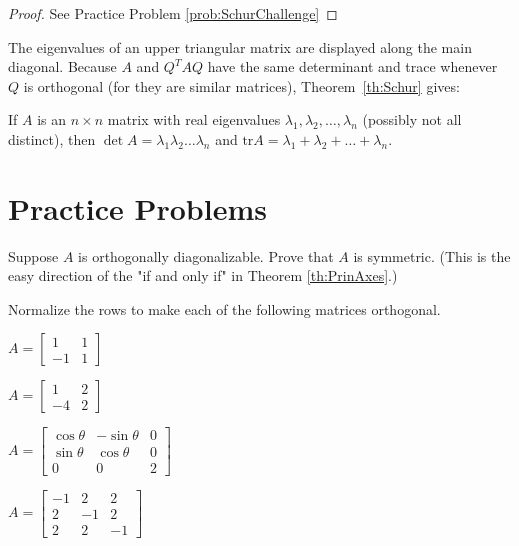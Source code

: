 \documentclass{ximera}
\begin{document}
\begin{proof}
See Practice Problem \ref{prob:SchurChallenge}
\end{proof}

The eigenvalues of an upper triangular matrix are displayed along the main diagonal. Because $A$ and $Q^{T}AQ$ have the same determinant and trace whenever $Q$ is orthogonal (for they are similar matrices), Theorem~\ref{th:Schur} gives:

\begin{corollary}\label{cor:det_and_tr}
If $A$ is an $n \times n$ matrix with real eigenvalues $\lambda_{1}, \lambda_{2}, \dots, \lambda_{n}$ (possibly not all distinct), then $\det A = \lambda_{1}\lambda_{2} \dots \lambda_{n}$ and $\mbox{tr} A = \lambda_{1} + \lambda_{2} + \dots  + \lambda_{n}$.
\end{corollary}

\section*{Practice Problems}

\begin{problem}\label{prob:ortho_diag_implies_symmetric}
Suppose $A$ is orthogonally diagonalizable.  Prove that $A$ is symmetric.  (This is the easy direction of the "if and only if" in Theorem \ref{th:PrinAxes}.)
\end{problem}

\begin{problem}%
Normalize the rows to make each of the following matrices orthogonal.

% 
\begin{problem}\label{prob:make_ortho_matrix1} 
$A = \begin{bmatrix}
1 & 1 \\
-1 & 1
\end{bmatrix}$
\end{problem}

\begin{problem}\label{prob:make_ortho_matrix3}
$A = \begin{bmatrix}
1 & 2 \\
-4 & 2
\end{bmatrix}$
\end{problem}

\begin{problem}\label{prob:make_ortho_matrix5}
$A = \begin{bmatrix}
\cos\theta & -\sin\theta & 0 \\
\sin\theta & \cos\theta & 0 \\
0 & 0 & 2
\end{bmatrix}$
\end{problem}

\begin{problem}\label{prob:make_ortho_matrix7}
$A = \begin{bmatrix}
-1 & 2 & 2 \\
2 & -1 & 2 \\
2 & 2 & -1
\end{bmatrix}$
\end{problem}
\end{problem}
\end{document}
